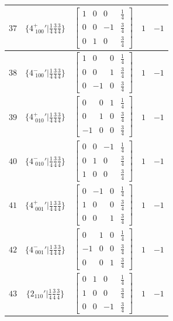 \documentclass[fleqn,8pt]{jsarticle}
\begin{document}
\begin{longtable}{ccccc}
$ 37 $ & $ \{4^{+}_{\,\,100}{}'|\frac{1}{4} \frac{3}{4} \frac{3}{4}\} $ & $ \begin{bmatrix} 1 & 0 & 0 & \frac{1}{4} \\ 0 & 0 & -1 & \frac{3}{4} \\ 0 & 1 & 0 & \frac{3}{4} \end{bmatrix} $ & $ 1 $ & $ -1 $ \\ \hline
$ 38 $ & $ \{4^{-}_{\,\,100}{}'|\frac{1}{4} \frac{3}{4} \frac{3}{4}\} $ & $ \begin{bmatrix} 1 & 0 & 0 & \frac{1}{4} \\ 0 & 0 & 1 & \frac{3}{4} \\ 0 & -1 & 0 & \frac{3}{4} \end{bmatrix} $ & $ 1 $ & $ -1 $ \\ \hline
$ 39 $ & $ \{4^{+}_{\,\,010}{}'|\frac{1}{4} \frac{3}{4} \frac{3}{4}\} $ & $ \begin{bmatrix} 0 & 0 & 1 & \frac{1}{4} \\ 0 & 1 & 0 & \frac{3}{4} \\ -1 & 0 & 0 & \frac{3}{4} \end{bmatrix} $ & $ 1 $ & $ -1 $ \\ \hline
$ 40 $ & $ \{4^{-}_{\,\,010}{}'|\frac{1}{4} \frac{3}{4} \frac{3}{4}\} $ & $ \begin{bmatrix} 0 & 0 & -1 & \frac{1}{4} \\ 0 & 1 & 0 & \frac{3}{4} \\ 1 & 0 & 0 & \frac{3}{4} \end{bmatrix} $ & $ 1 $ & $ -1 $ \\ \hline
$ 41 $ & $ \{4^{+}_{\,\,001}{}'|\frac{1}{4} \frac{3}{4} \frac{3}{4}\} $ & $ \begin{bmatrix} 0 & -1 & 0 & \frac{1}{4} \\ 1 & 0 & 0 & \frac{3}{4} \\ 0 & 0 & 1 & \frac{3}{4} \end{bmatrix} $ & $ 1 $ & $ -1 $ \\ \hline
$ 42 $ & $ \{4^{-}_{\,\,001}{}'|\frac{1}{4} \frac{3}{4} \frac{3}{4}\} $ & $ \begin{bmatrix} 0 & 1 & 0 & \frac{1}{4} \\ -1 & 0 & 0 & \frac{3}{4} \\ 0 & 0 & 1 & \frac{3}{4} \end{bmatrix} $ & $ 1 $ & $ -1 $ \\ \hline
$ 43 $ & $ \{2{}_{110}{}'|\frac{1}{4} \frac{3}{4} \frac{3}{4}\} $ & $ \begin{bmatrix} 0 & 1 & 0 & \frac{1}{4} \\ 1 & 0 & 0 & \frac{3}{4} \\ 0 & 0 & -1 & \frac{3}{4} \end{bmatrix} $ & $ 1 $ & $ -1 $ \\ \hline

\end{longtable}
\end{document}
